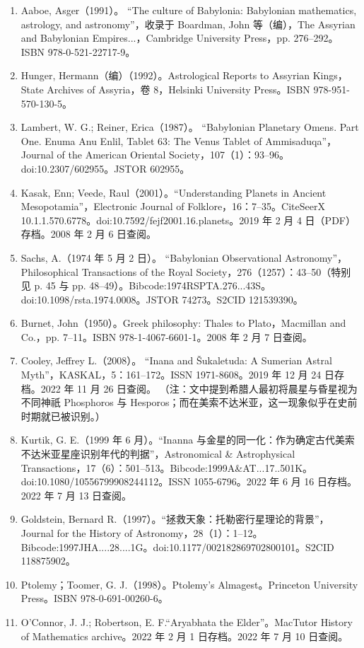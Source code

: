 \begin{enumerate}
\item Aaboe, Asger（1991）。
“The culture of Babylonia: Babylonian mathematics, astrology, and astronomy”，收录于 Boardman, John 等（编），The Assyrian and Babylonian Empires...，Cambridge University Press，pp. 276–292。ISBN 978-0-521-22717-9。
\item Hunger, Hermann（编）（1992）。Astrological Reports to Assyrian Kings，State Archives of Assyria，卷 8，Helsinki University Press。ISBN 978-951-570-130-5。
\item Lambert, W. G.; Reiner, Erica（1987）。
“Babylonian Planetary Omens. Part One. Enuma Anu Enlil, Tablet 63: The Venus Tablet of Ammisaduqa”，Journal of the American Oriental Society，107（1）：93–96。doi:10.2307/602955。JSTOR 602955。
\item Kasak, Enn; Veede, Raul（2001）。“Understanding Planets in Ancient Mesopotamia”，Electronic Journal of Folklore，16：7–35。CiteSeerX 10.1.1.570.6778。doi:10.7592/fejf2001.16.planets。2019 年 2 月 4 日（PDF）存档。2008 年 2 月 6 日查阅。
\item Sachs, A.（1974 年 5 月 2 日）。
“Babylonian Observational Astronomy”，Philosophical Transactions of the Royal Society，276（1257）：43–50（特别见 p. 45 与 pp. 48–49）。Bibcode:1974RSPTA.276...43S。doi:10.1098/rsta.1974.0008。JSTOR 74273。S2CID 121539390。
\item Burnet, John（1950）。Greek philosophy: Thales to Plato，Macmillan and Co.，pp. 7–11。ISBN 978-1-4067-6601-1。2008 年 2 月 7 日查阅。
\item Cooley, Jeffrey L.（2008）。
“Inana and Šukaletuda: A Sumerian Astral Myth”，KASKAL，5：161–172。ISSN 1971-8608。2019 年 12 月 24 日存档。2022 年 11 月 26 日查阅。
（注：文中提到希腊人最初将晨星与昏星视为不同神祇 Phosphoros 与 Hesporos；而在美索不达米亚，这一现象似乎在史前时期就已被识别。）
\item Kurtik, G. E.（1999 年 6 月）。“Inanna 与金星的同一化：作为确定古代美索不达米亚星座识别年代的判据”，Astronomical & Astrophysical Transactions，17（6）：501–513。Bibcode:1999A&AT...17..501K。doi:10.1080/10556799908244112。ISSN 1055-6796。2022 年 6 月 16 日存档。2022 年 7 月 13 日查阅。
\item Goldstein, Bernard R.（1997）。“拯救天象：托勒密行星理论的背景”，Journal for the History of Astronomy，28（1）：1–12。Bibcode:1997JHA....28....1G。doi:10.1177/002182869702800101。S2CID 118875902。
\item Ptolemy；Toomer, G. J.（1998）。Ptolemy's Almagest。Princeton University Press。ISBN 978-0-691-00260-6。
\item O'Connor, J. J.; Robertson, E. F.“Aryabhata the Elder”。MacTutor History of Mathematics archive。2022 年 2 月 1 日存档。2022 年 7 月 10 日查阅。

\end{enumerate}
